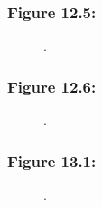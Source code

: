 \documentclass[t]{beamer}\usepackage[]{graphicx}\usepackage[]{color}
\begin{document}
\begin{frame}[label=Figure_12_5]
\frametitle{Figure 12.5: }
\begin{figure}[t]
\begin{minipage}[b]{\textwidth}
\centering

\caption{.}
\end{minipage}
\end{figure}
\end{frame}


\begin{frame}[label=Figure_12_6]
\frametitle{Figure 12.6: }
\begin{figure}[t]
\begin{minipage}[b]{\textwidth}
\centering

\caption{.}
\end{minipage}
\end{figure}
\end{frame}


\begin{frame}[label=Figure_13_1]
\frametitle{Figure 13.1: }
\begin{figure}[t]
\begin{minipage}[b]{\textwidth}
\centering

\caption{.}
\end{minipage}
\end{figure}
\end{frame}
\end{document}
